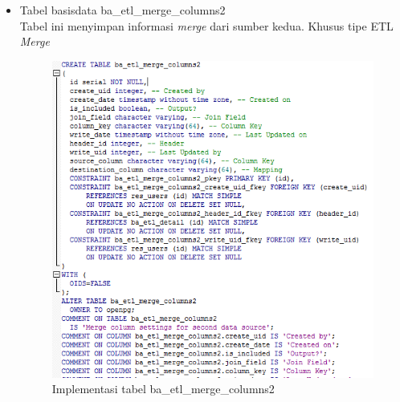 \begin{itemize}
		\item Tabel basisdata ba\_etl\_merge\_columns2\\
		Tabel ini menyimpan informasi \textit{merge} dari sumber kedua. Khusus tipe ETL \textit{Merge}
		\begin{figure}[H]
		\centering
		\includegraphics[scale=0.5]{Gambar/tabel-ba-etl-merge-columns2}
		\caption{Implementasi tabel ba\_etl\_merge\_columns2}
		\end{figure}
		

\end{itemize}
